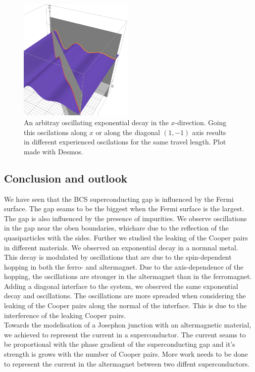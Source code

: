 \documentclass[..\main.tex]{subfile}
\begin{document}
\begin{figure}[H]
  \centering
  \includegraphics[width=0.5\textwidth]{Ressources/CooperPairsOrient.PNG}
  \caption{An arbitray oscillating exponential decay in the $x$-direction. Going this oscilations along $x$ or along the diagonal $(1,-1)$ axis results in different
  experienced oscilations for the same travel length. Plot made with Desmos.}
\end{figure}

\subsection{Conclusion and outlook}
We have seen that the BCS superconducting gap is influenced by the Fermi surface. The gap seams to be the biggest when the Fermi surface is the largest.
The gap is also influenced by the presence of impurities. We observe oscillations in the gap near the oben boundaries, whichare due to the reflection
of the quasiparticles with the sides.
Further we studied the leaking of the Cooper pairs in different materials. We observed an exponential decay in a normnal metal.
This decay is modulated by oscillations that are due to the spin-dependent hopping in both the ferro- and altermagnet.
Due to the axis-dependence of the hopping, the oscillations are stronger in the altermagnet than in the ferromagnet.\\
Adding a diagonal interface to the system, we observed the same exponential decay and oscillations. The oscillations are more spreaded when considering
the leaking of the Cooper pairs along the normal of the interface. This is due to the interference of the leaking Cooper pairs.\\
Towards the modelisation of a Josephon junction with an altermagnetic material, we achieved to represent the current in a superconductor.
The current seams to be proportional with the phase gradient of the superconducting gap and it's strength is grows with the number of Cooper pairs.
More work needs to be done to represent the current in the altermagnet between two diffent superconductors.\\
\end{document}

